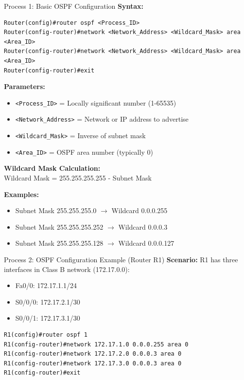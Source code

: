 \documentclass[12pt,a4paper]{article}
\begin{document}
\begin{commandbox}{Process 1: Basic OSPF Configuration}
\textbf{Syntax:}
\begin{lstlisting}
Router(config)#router ospf <Process_ID>
Router(config-router)#network <Network_Address> <Wildcard_Mask> area <Area_ID>
Router(config-router)#network <Network_Address> <Wildcard_Mask> area <Area_ID>
Router(config-router)#exit
\end{lstlisting}

\textbf{Parameters:}
\begin{itemize}[noitemsep]
    \item \texttt{<Process\_ID>} = Locally significant number (1-65535)
    \item \texttt{<Network\_Address>} = Network or IP address to advertise
    \item \texttt{<Wildcard\_Mask>} = Inverse of subnet mask
    \item \texttt{<Area\_ID>} = OSPF area number (typically 0)
\end{itemize}
\end{commandbox}

\begin{notebox}
\textbf{Wildcard Mask Calculation:}\\
Wildcard Mask = 255.255.255.255 - Subnet Mask

\vspace{0.2cm}
\textbf{Examples:}
\begin{itemize}[noitemsep]
    \item Subnet Mask 255.255.255.0 $\rightarrow$ Wildcard 0.0.0.255
    \item Subnet Mask 255.255.255.252 $\rightarrow$ Wildcard 0.0.0.3
    \item Subnet Mask 255.255.255.128 $\rightarrow$ Wildcard 0.0.0.127
\end{itemize}
\end{notebox}

\begin{commandbox}{Process 2: OSPF Configuration Example (Router R1)}
\textbf{Scenario:} R1 has three interfaces in Class B network (172.17.0.0):
\begin{itemize}[noitemsep]
    \item Fa0/0: 172.17.1.1/24
    \item S0/0/0: 172.17.2.1/30
    \item S0/0/1: 172.17.3.1/30
\end{itemize}

\begin{lstlisting}
R1(config)#router ospf 1
R1(config-router)#network 172.17.1.0 0.0.0.255 area 0
R1(config-router)#network 172.17.2.0 0.0.0.3 area 0
R1(config-router)#network 172.17.3.0 0.0.0.3 area 0
R1(config-router)#exit
\end{lstlisting}
\end{commandbox}
\end{document}
